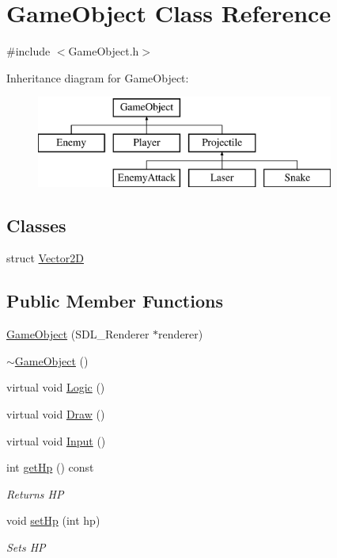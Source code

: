 \hypertarget{class_game_object}{}\section{Game\+Object Class Reference}
\label{class_game_object}


{\ttfamily \#include $<$Game\+Object.\+h$>$}

Inheritance diagram for Game\+Object\+:\begin{figure}[H]
\begin{center}
\leavevmode
\includegraphics[height=3.000000cm]{class_game_object}
\end{center}
\end{figure}
\subsection*{Classes}
\begin{DoxyCompactItemize}
\item 
struct \mbox{\hyperlink{struct_game_object_1_1_vector2_d}{Vector2D}}
\end{DoxyCompactItemize}
\subsection*{Public Member Functions}
\begin{DoxyCompactItemize}
\item 
\mbox{\hyperlink{class_game_object_a0b60783781874241ad26049ad968a78b}{Game\+Object}} (S\+D\+L\+\_\+\+Renderer $\ast$renderer)
\item 
\mbox{\hyperlink{class_game_object_ab82dfdb656f9051c0587e6593b2dda97}{$\sim$\+Game\+Object}} ()
\item 
virtual void \mbox{\hyperlink{class_game_object_a79510ffc77339fe850491dce9f580fa9}{Logic}} ()
\item 
virtual void \mbox{\hyperlink{class_game_object_ad3ac1deac50048cf7a1a19eb0e61ad26}{Draw}} ()
\item 
virtual void \mbox{\hyperlink{class_game_object_a430742cf91abb99337c556c88bef880a}{Input}} ()
\item 
int \mbox{\hyperlink{class_game_object_a13b96d5c268bca096f8e3a3e85d35732}{get\+Hp}} () const
\begin{DoxyCompactList}\small\item\em Returns HP \end{DoxyCompactList}\item 
void \mbox{\hyperlink{class_game_object_a7aa67e2bbfd37af89d86df0b030b5a81}{set\+Hp}} (int hp)
\begin{DoxyCompactList}\small\item\em Sets HP \end{DoxyCompactList}\end{DoxyCompactItemize}
